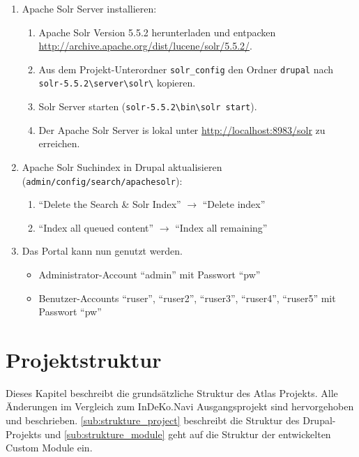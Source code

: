 \begin{enumerate}
	\item Apache Solr Server installieren:
	\begin{enumerate}
		\item Apache Solr Version 5.5.2 herunterladen und entpacken \url{http://archive.apache.org/dist/lucene/solr/5.5.2/}.
		
		\item Aus dem Projekt-Unterordner \lstinline|solr_config| den Ordner \lstinline|drupal| nach \lstinline|solr-5.5.2\server\solr\| kopieren.
		
		\item Solr Server starten (\zB \lstinline|solr-5.5.2\bin\solr start|).
		\item Der Apache Solr Server is lokal unter \url{http://localhost:8983/solr} zu erreichen.
	\end{enumerate}
	
	\item Apache Solr Suchindex in Drupal aktualisieren (\lstinline|admin/config/search/apachesolr|):
	\begin{enumerate}
		\item \enquote{Delete the Search \& Solr Index} $\rightarrow$ \enquote{Delete index}
		
		\item \enquote{Index all queued content}  $\rightarrow$ \enquote{Index all remaining}  
	\end{enumerate}
	
	\item Das Portal kann nun genutzt werden.
	\begin{itemize}
		\item Administrator-Account \enquote{admin} mit Passwort \enquote{pw}
		\item Benutzer-Accounts \enquote{ruser}, \enquote{ruser2}, \enquote{ruser3}, \enquote{ruser4}, \enquote{ruser5}  mit Passwort \enquote{pw}
	\end{itemize}
\end{enumerate}



\section{Projektstruktur}
Dieses Kapitel beschreibt die grundsätzliche Struktur des Atlas Projekts. Alle Änderungen im Vergleich zum InDeKo.Navi Ausgangsprojekt sind hervorgehoben und beschrieben. \cref{sub:strukture_project} beschreibt die Struktur des Drupal-Projekts und \cref{sub:strukture_module} geht auf die Struktur der entwickelten Custom Module ein.


